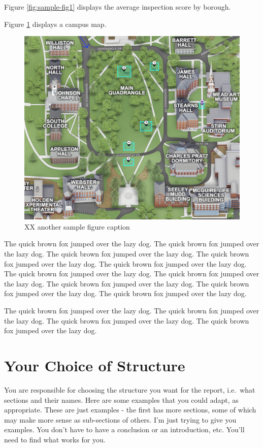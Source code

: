\documentclass[12pt]{article}
\begin{document}
Figure \ref{fig:sample-fig1} displays the average inspection score by
borough.

Figure \ref{fig:sample-fig2} displays a campus map.

\begin{figure}
\includegraphics[width=0.8\linewidth]{gfx/campus_map} \caption{XX another sample figure caption}\label{fig:sample-fig2}
\end{figure}

The quick brown fox jumped over the lazy dog. The quick brown fox jumped
over the lazy dog. The quick brown fox jumped over the lazy dog. The
quick brown fox jumped over the lazy dog. The quick brown fox jumped
over the lazy dog. The quick brown fox jumped over the lazy dog. The
quick brown fox jumped over the lazy dog. The quick brown fox jumped
over the lazy dog. The quick brown fox jumped over the lazy dog. The
quick brown fox jumped over the lazy dog.

The quick brown fox jumped over the lazy dog. The quick brown fox jumped
over the lazy dog. The quick brown fox jumped over the lazy dog. The
quick brown fox jumped over the lazy dog.

\hypertarget{your-choice-of-structure}{%
\section{Your Choice of Structure}\label{your-choice-of-structure}}

You are responsible for choosing the structure you want for the report,
i.e.~what sections and their names. Here are some examples that you
could adapt, as appropriate. These are just examples - the first has
more sections, some of which may make more sense as sub-sections of
others. I'm just trying to give you examples. You don't have to have a
conclusion or an introduction, etc. You'll need to find what works for
you.
\end{document}

